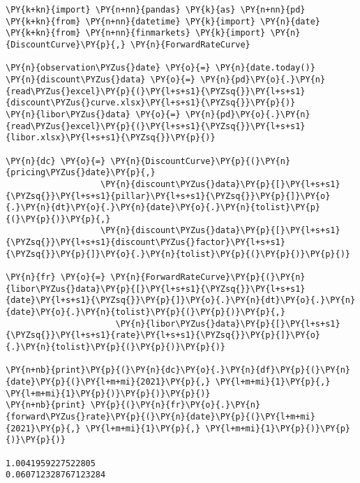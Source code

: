 \begin{codebox}[breakable, size=fbox, boxrule=1pt, pad at break*=1mm,colback=cellbackground, colframe=cellborder]
\begin{Verbatim}[commandchars=\\\{\}]
\PY{k+kn}{import} \PY{n+nn}{pandas} \PY{k}{as} \PY{n+nn}{pd}
\PY{k+kn}{from} \PY{n+nn}{datetime} \PY{k}{import} \PY{n}{date}
\PY{k+kn}{from} \PY{n+nn}{finmarkets} \PY{k}{import} \PY{n}{DiscountCurve}\PY{p}{,} \PY{n}{ForwardRateCurve}

\PY{n}{observation\PYZus{}date} \PY{o}{=} \PY{n}{date.today()}
\PY{n}{discount\PYZus{}data} \PY{o}{=} \PY{n}{pd}\PY{o}{.}\PY{n}{read\PYZus{}excel}\PY{p}{(}\PY{l+s+s1}{\PYZsq{}}\PY{l+s+s1}{discount\PYZus{}curve.xlsx}\PY{l+s+s1}{\PYZsq{}}\PY{p}{)}
\PY{n}{libor\PYZus{}data} \PY{o}{=} \PY{n}{pd}\PY{o}{.}\PY{n}{read\PYZus{}excel}\PY{p}{(}\PY{l+s+s1}{\PYZsq{}}\PY{l+s+s1}{libor.xlsx}\PY{l+s+s1}{\PYZsq{}}\PY{p}{)}

\PY{n}{dc} \PY{o}{=} \PY{n}{DiscountCurve}\PY{p}{(}\PY{n}{pricing\PYZus{}date}\PY{p}{,} 
                   \PY{n}{discount\PYZus{}data}\PY{p}{[}\PY{l+s+s1}{\PYZsq{}}\PY{l+s+s1}{pillar}\PY{l+s+s1}{\PYZsq{}}\PY{p}{]}\PY{o}{.}\PY{n}{dt}\PY{o}{.}\PY{n}{date}\PY{o}{.}\PY{n}{tolist}\PY{p}{(}\PY{p}{)}\PY{p}{,}
                   \PY{n}{discount\PYZus{}data}\PY{p}{[}\PY{l+s+s1}{\PYZsq{}}\PY{l+s+s1}{discount\PYZus{}factor}\PY{l+s+s1}{\PYZsq{}}\PY{p}{]}\PY{o}{.}\PY{n}{tolist}\PY{p}{(}\PY{p}{)}\PY{p}{)}

\PY{n}{fr} \PY{o}{=} \PY{n}{ForwardRateCurve}\PY{p}{(}\PY{n}{libor\PYZus{}data}\PY{p}{[}\PY{l+s+s1}{\PYZsq{}}\PY{l+s+s1}{date}\PY{l+s+s1}{\PYZsq{}}\PY{p}{]}\PY{o}{.}\PY{n}{dt}\PY{o}{.}\PY{n}{date}\PY{o}{.}\PY{n}{tolist}\PY{p}{(}\PY{p}{)}\PY{p}{,}
                      \PY{n}{libor\PYZus{}data}\PY{p}{[}\PY{l+s+s1}{\PYZsq{}}\PY{l+s+s1}{rate}\PY{l+s+s1}{\PYZsq{}}\PY{p}{]}\PY{o}{.}\PY{n}{tolist}\PY{p}{(}\PY{p}{)}\PY{p}{)}

\PY{n+nb}{print}\PY{p}{(}\PY{n}{dc}\PY{o}{.}\PY{n}{df}\PY{p}{(}\PY{n}{date}\PY{p}{(}\PY{l+m+mi}{2021}\PY{p}{,} \PY{l+m+mi}{1}\PY{p}{,} \PY{l+m+mi}{1}\PY{p}{)}\PY{p}{)}\PY{p}{)}
\PY{n+nb}{print} \PY{p}{(}\PY{n}{fr}\PY{o}{.}\PY{n}{forward\PYZus{}rate}\PY{p}{(}\PY{n}{date}\PY{p}{(}\PY{l+m+mi}{2021}\PY{p}{,} \PY{l+m+mi}{1}\PY{p}{,} \PY{l+m+mi}{1}\PY{p}{)}\PY{p}{)}\PY{p}{)}

1.0041959227522805
0.060712328767123284
\end{Verbatim}
\end{codebox}

